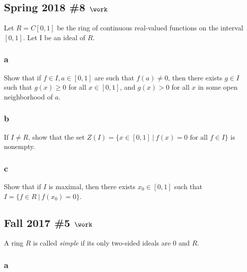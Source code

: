 \hypertarget{spring-2018-8-work}{%
\subsection{\texorpdfstring{Spring 2018 \#8
\(\work\)}{Spring 2018 \#8 \textbackslash work}}\label{spring-2018-8-work}}

Let \(R = C[0, 1]\) be the ring of continuous real-valued functions on
the interval \([0, 1]\). Let I be an ideal of \(R\).

\hypertarget{a-39}{%
\subsubsection{a}\label{a-39}}

Show that if \(f \in I, a \in [0, 1]\) are such that \(f (a) \neq 0\),
then there exists \(g \in I\) such that \(g(x) \geq 0\) for all
\(x \in [0, 1]\), and \(g(x) > 0\) for all \(x\) in some open
neighborhood of \(a\).

\hypertarget{b-29}{%
\subsubsection{b}\label{b-29}}

If \(I \neq R\), show that the set
\(Z(I) = \{x \in [0, 1] {~\mathrel{\Big|}~}f(x) = 0 \text{ for all } f \in I\}\)
is nonempty.

\hypertarget{c-22}{%
\subsubsection{c}\label{c-22}}

Show that if \(I\) is maximal, then there exists \(x_0 \in [0, 1]\) such
that \(I = \{ f \in R {~\mathrel{\Big|}~}f (x_0 ) = 0\}\).

\hypertarget{fall-2017-5-work}{%
\subsection{\texorpdfstring{Fall 2017 \#5
\(\work\)}{Fall 2017 \#5 \textbackslash work}}\label{fall-2017-5-work}}

A ring \(R\) is called \emph{simple} if its only two-sided ideals are
\(0\) and \(R\).

\hypertarget{a-40}{%
\subsubsection{a}\label{a-40}}


